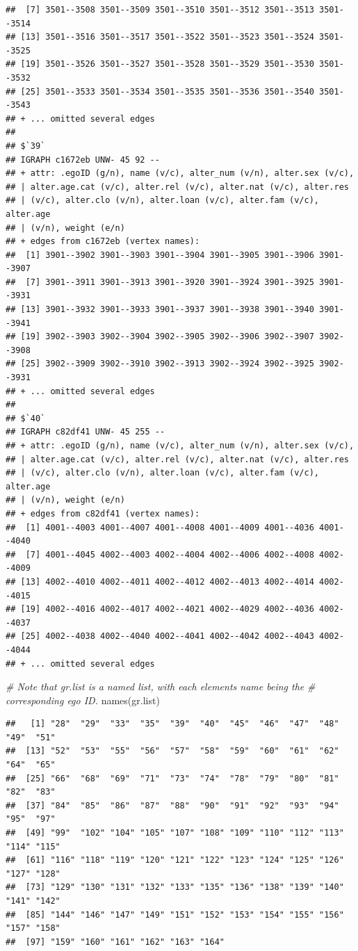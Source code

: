 \documentclass[
]{book}
\newenvironment{Shaded}{\begin{snugshade}}{\end{snugshade}}
\newcommand{\CommentTok}[1]{\textcolor[rgb]{0.56,0.35,0.01}{\textit{#1}}}
\newcommand{\FunctionTok}[1]{\textcolor[rgb]{0.00,0.00,0.00}{#1}}
\newcommand{\NormalTok}[1]{#1}
\begin{document}
\begin{verbatim}
##  [7] 3501--3508 3501--3509 3501--3510 3501--3512 3501--3513 3501--3514
## [13] 3501--3516 3501--3517 3501--3522 3501--3523 3501--3524 3501--3525
## [19] 3501--3526 3501--3527 3501--3528 3501--3529 3501--3530 3501--3532
## [25] 3501--3533 3501--3534 3501--3535 3501--3536 3501--3540 3501--3543
## + ... omitted several edges
## 
## $`39`
## IGRAPH c1672eb UNW- 45 92 -- 
## + attr: .egoID (g/n), name (v/c), alter_num (v/n), alter.sex (v/c),
## | alter.age.cat (v/c), alter.rel (v/c), alter.nat (v/c), alter.res
## | (v/c), alter.clo (v/n), alter.loan (v/c), alter.fam (v/c), alter.age
## | (v/n), weight (e/n)
## + edges from c1672eb (vertex names):
##  [1] 3901--3902 3901--3903 3901--3904 3901--3905 3901--3906 3901--3907
##  [7] 3901--3911 3901--3913 3901--3920 3901--3924 3901--3925 3901--3931
## [13] 3901--3932 3901--3933 3901--3937 3901--3938 3901--3940 3901--3941
## [19] 3902--3903 3902--3904 3902--3905 3902--3906 3902--3907 3902--3908
## [25] 3902--3909 3902--3910 3902--3913 3902--3924 3902--3925 3902--3931
## + ... omitted several edges
## 
## $`40`
## IGRAPH c82df41 UNW- 45 255 -- 
## + attr: .egoID (g/n), name (v/c), alter_num (v/n), alter.sex (v/c),
## | alter.age.cat (v/c), alter.rel (v/c), alter.nat (v/c), alter.res
## | (v/c), alter.clo (v/n), alter.loan (v/c), alter.fam (v/c), alter.age
## | (v/n), weight (e/n)
## + edges from c82df41 (vertex names):
##  [1] 4001--4003 4001--4007 4001--4008 4001--4009 4001--4036 4001--4040
##  [7] 4001--4045 4002--4003 4002--4004 4002--4006 4002--4008 4002--4009
## [13] 4002--4010 4002--4011 4002--4012 4002--4013 4002--4014 4002--4015
## [19] 4002--4016 4002--4017 4002--4021 4002--4029 4002--4036 4002--4037
## [25] 4002--4038 4002--4040 4002--4041 4002--4042 4002--4043 4002--4044
## + ... omitted several edges
\end{verbatim}

\begin{Shaded}
\begin{Highlighting}[]
\CommentTok{\# Note that gr.list is a named list, with each element\textquotesingle{}s name being the }
\CommentTok{\# corresponding ego ID.}
\FunctionTok{names}\NormalTok{(gr.list)}
\end{Highlighting}
\end{Shaded}

\begin{verbatim}
##   [1] "28"  "29"  "33"  "35"  "39"  "40"  "45"  "46"  "47"  "48"  "49"  "51" 
##  [13] "52"  "53"  "55"  "56"  "57"  "58"  "59"  "60"  "61"  "62"  "64"  "65" 
##  [25] "66"  "68"  "69"  "71"  "73"  "74"  "78"  "79"  "80"  "81"  "82"  "83" 
##  [37] "84"  "85"  "86"  "87"  "88"  "90"  "91"  "92"  "93"  "94"  "95"  "97" 
##  [49] "99"  "102" "104" "105" "107" "108" "109" "110" "112" "113" "114" "115"
##  [61] "116" "118" "119" "120" "121" "122" "123" "124" "125" "126" "127" "128"
##  [73] "129" "130" "131" "132" "133" "135" "136" "138" "139" "140" "141" "142"
##  [85] "144" "146" "147" "149" "151" "152" "153" "154" "155" "156" "157" "158"
##  [97] "159" "160" "161" "162" "163" "164"
\end{verbatim}
\end{document}
